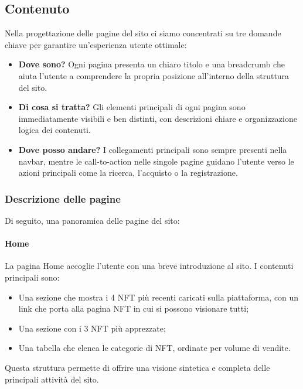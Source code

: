 \documentclass[10pt]{article}
\begin{document}
\subsection{Contenuto} Nella progettazione delle pagine del sito ci siamo concentrati su tre domande chiave per garantire un’esperienza utente ottimale: \begin{itemize} \item \textbf{Dove sono?} Ogni pagina presenta un chiaro titolo e una breadcrumb che aiuta l’utente a comprendere la propria posizione all’interno della struttura del sito. \item \textbf{Di cosa si tratta?} Gli elementi principali di ogni pagina sono immediatamente visibili e ben distinti, con descrizioni chiare e organizzazione logica dei contenuti. \item \textbf{Dove posso andare?} I collegamenti principali sono sempre presenti nella navbar, mentre le call-to-action nelle singole pagine guidano l’utente verso le azioni principali come la ricerca, l’acquisto o la registrazione. \end{itemize}

\subsubsection{Descrizione delle pagine} Di seguito, una panoramica delle pagine del sito:

\paragraph{Home} La pagina Home accoglie l’utente con una breve introduzione al sito. I contenuti principali sono:
\begin{itemize}
    \item Una sezione che mostra i 4 NFT più recenti caricati sulla piattaforma, con un link che porta alla pagina NFT in cui si possono visionare tutti;
    \item Una sezione con i 3 NFT più apprezzate;
    \item Una tabella che elenca le categorie di NFT, ordinate per volume di vendite.
\end{itemize}
Questa struttura permette di offrire una visione sintetica e completa delle principali attività del sito.
\end{document}
